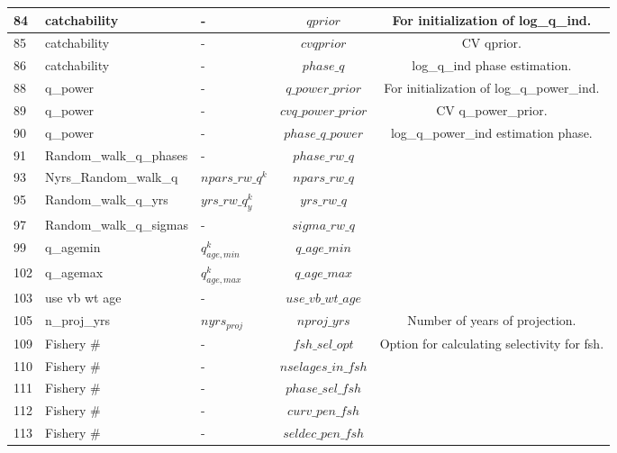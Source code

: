 \documentclass{article}
\begin{document}
\begin{tabular}{| p{0.9cm} | p{4.0cm}  | p{1.9cm} | c | c |}
84 & catchability & -  &  $qprior$& For initialization of log\_q\_ind.\\ \hline
85 & catchability &  - &  $cvqprior$& CV qprior.\\ \hline
86 & catchability & -  &  $phase\_q$& log\_q\_ind phase estimation.\\ \hline
88 & q\_power & -  & $q\_power\_prior$ & For initialization of log\_q\_power\_ind.\\ \hline
89 & q\_power &  - & $cvq\_power\_prior$ & CV q\_power\_prior.\\ \hline
90 & q\_power &  - & $phase\_q\_power$  & log\_q\_power\_ind estimation phase.\\ \hline
91 & Random\_walk\_q\_phases & -  & $phase\_rw\_q$ &\\ \hline
93 & Nyrs\_Random\_walk\_q & $npars\_rw\_q^k$   & $npars\_rw\_q$ &\\ \hline
95 & Random\_walk\_q\_yrs & $yrs\_rw\_q^k_y$  & $yrs\_rw\_q$ &\\ \hline
97 & Random\_walk\_q\_sigmas &  - & $sigma\_rw\_q$ &\\ \hline
99 & q\_agemin &  $q_{age,min}^k$ & $q\_age\_min$ &\\ \hline
102 & q\_agemax &   $q_{age,max}^k$ & $q\_age\_max$  &\\ \hline
103 & use vb wt age & -  & $use\_vb\_wt\_age$  &\\ \hline
105 & n\_proj\_yrs &  $nyrs_{proj}$ & $nproj\_yrs$ & Number of years of projection.\\ \hline
109 & Fishery \#  &  - & $fsh\_sel\_opt$  & Option for calculating selectivity for fsh.\\ \hline
110 & Fishery \# & -  & $nselages\_in\_fsh$  &\\ \hline
111 & Fishery \# & -  & $phase\_sel\_fsh$  &\\ \hline
112 & Fishery \# &  - & $curv\_pen\_fsh$ &\\ \hline
113 & Fishery \# &  - & $seldec\_pen\_fsh$ &\\ \hline

\end{tabular} 
\end{document}
